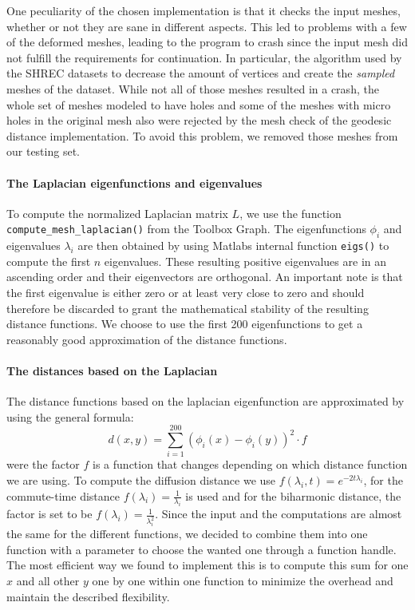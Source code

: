 One peculiarity of the chosen implementation is that it checks the input meshes, whether or not they are sane in different aspects.
This led to problems with a few of the deformed meshes, leading to the program to crash since the input mesh did not fulfill the requirements for continuation.
In particular, the algorithm used by the SHREC datasets to decrease the amount of vertices and create the \textit{sampled} meshes of the dataset.
While not all of those meshes resulted in a crash, the whole set of meshes modeled to have holes and some of the meshes with micro holes in the original mesh also were rejected by the mesh check of the geodesic distance implementation.
To avoid this problem, we removed those meshes from our testing set.

\paragraph{The Laplacian eigenfunctions and eigenvalues}
To compute the normalized Laplacian matrix $L$, we use the function \texttt{compute\_mesh\_laplacian()} from the Toolbox Graph.
The eigenfunctions $\phi_i$ and eigenvalues $\lambda_i$ are then obtained by using Matlabs internal function \texttt{eigs()} to compute the first $n$ eigenvalues.
These resulting positive eigenvalues are in an ascending order and their eigenvectors are orthogonal.
An important note is that the first eigenvalue is either zero or at least very close to zero and should therefore be discarded to grant the mathematical stability of the resulting distance functions.
We choose to use the first 200 eigenfunctions to get a reasonably good approximation of the distance functions.

\paragraph{The distances based on the Laplacian}
The distance functions based on the laplacian eigenfunction are approximated by using the general formula:
\begin{equation}
	d(x,y) = \sum_{i=1}^{200} (\phi_i(x) - \phi_i(y))^2 \cdot f
\end{equation}
were the factor $f$ is a function that changes depending on which distance function we are using.
To compute the diffusion distance we use $f(\lambda_i,t) = e^{-2t\lambda_i}$, for the commute-time distance $f(\lambda_i) = \frac{1}{\lambda_i}$ is used and for the biharmonic distance, the factor is set to be $f(\lambda_i) = \frac{1}{\lambda_i^2}$.
Since the input and the computations are almost the same for the different functions, we decided to combine them into one function with a parameter to choose the wanted one through a function handle.
The most efficient way we found to implement this is to compute this sum for one $x$ and all other $y$ one by one within one function to minimize the overhead and maintain the described flexibility.

